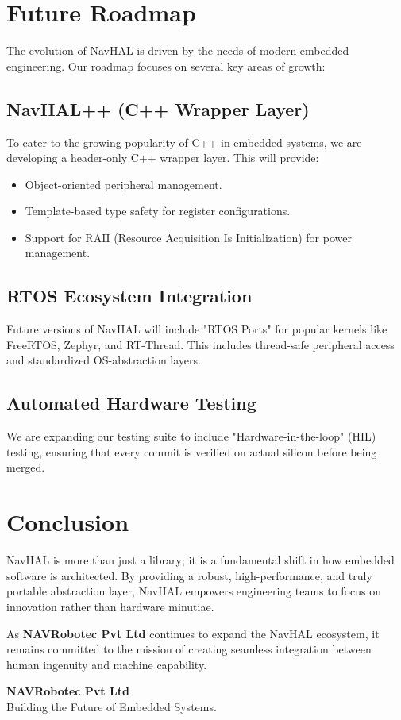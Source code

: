 \section{Future Roadmap}
\label{sec:roadmap}

The evolution of NavHAL is driven by the needs of modern embedded engineering. Our roadmap focuses on several key areas of growth:

\subsection{NavHAL++ (C++ Wrapper Layer)}
To cater to the growing popularity of C++ in embedded systems, we are developing a header-only C++ wrapper layer. This will provide:
\begin{itemize}
    \item Object-oriented peripheral management.
    \item Template-based type safety for register configurations.
    \item Support for RAII (Resource Acquisition Is Initialization) for power management.
\end{itemize}

\subsection{RTOS Ecosystem Integration}
Future versions of NavHAL will include "RTOS Ports" for popular kernels like FreeRTOS, Zephyr, and RT-Thread. This includes thread-safe peripheral access and standardized OS-abstraction layers.

\subsection{Automated Hardware Testing}
We are expanding our testing suite to include "Hardware-in-the-loop" (HIL) testing, ensuring that every commit is verified on actual silicon before being merged.

\section{Conclusion}
NavHAL is more than just a library; it is a fundamental shift in how embedded software is architected. By providing a robust, high-performance, and truly portable abstraction layer, NavHAL empowers engineering teams to focus on innovation rather than hardware minutiae.

As \textbf{NAVRobotec Pvt Ltd} continues to expand the NavHAL ecosystem, it remains committed to the mission of creating seamless integration between human ingenuity and machine capability.

\vfill
\begin{center}
    \textbf{NAVRobotec Pvt Ltd} \\
    Building the Future of Embedded Systems.
\end{center}
